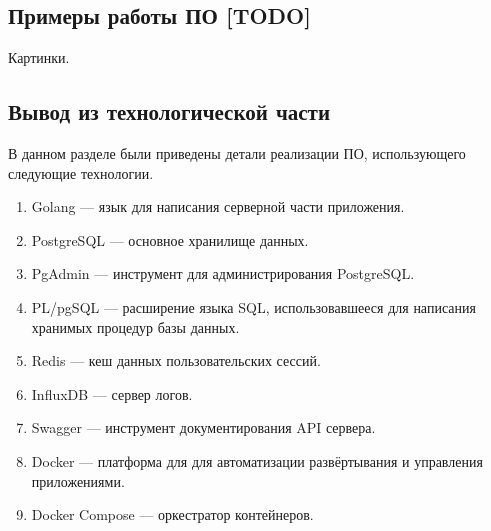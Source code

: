 \subsection{Примеры работы ПО [TODO]}

Картинки.



\subsection{Вывод из технологической части}

В данном разделе были приведены детали реализации ПО, использующего следующие технологии.

\begin{enumerate}[label*=\arabic*.]
	\item Golang --- язык для написания серверной части приложения.
	\item PostgreSQL --- основное хранилище данных.
	\item PgAdmin --- инструмент для администрирования PostgreSQL.
	\item PL/pgSQL --- расширение языка SQL, использовавшееся для написания хранимых процедур базы данных.
	\item Redis --- кеш данных пользовательских сессий.
	\item InfluxDB --- сервер логов.
	\item Swagger --- инструмент документирования API сервера.
	\item Docker --- платформа для для автоматизации развёртывания и управления приложениями.
	\item Docker Compose --- оркестратор контейнеров.
\end{enumerate}

\pagebreak